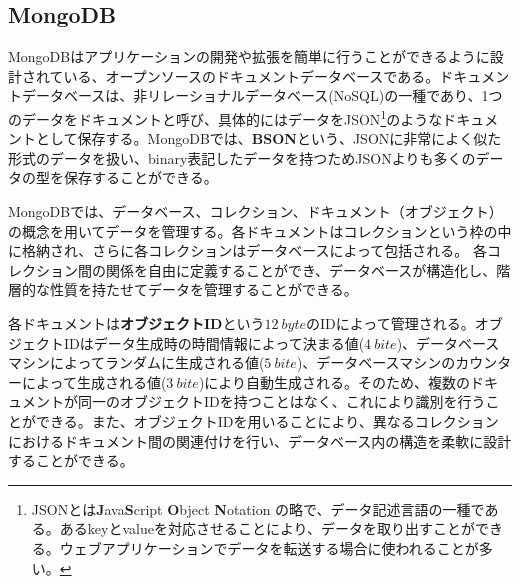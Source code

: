 \subsection{MongoDB\cite{mongo}}
\label{sec:mongo}

MongoDBはアプリケーションの開発や拡張を簡単に行うことができるように設計されている、オープンソースのドキュメントデータベースである。ドキュメントデータベースは、非リレーショナルデータベース(NoSQL)の一種であり、1つのデータをドキュメントと呼び、具体的にはデータをJSON\footnote{JSONとは\textbf{J}ava\textbf{S}cript \textbf{O}bject \textbf{N}otation の略で、データ記述言語の一種である。あるkeyとvalueを対応させることにより、データを取り出すことができる。ウェブアプリケーションでデータを転送する場合に使われることが多い。}のようなドキュメントとして保存する。MongoDBでは、\textbf{BSON}という、JSONに非常によく似た形式のデータを扱い、binary表記したデータを持つためJSONよりも多くのデータの型を保存することができる。

MongoDBでは、データベース、コレクション、ドキュメント（オブジェクト）の概念を用いてデータを管理する。各ドキュメントはコレクションという枠の中に格納され、さらに各コレクションはデータベースによって包括される。
各コレクション間の関係を自由に定義することができ、データベースが構造化し、階層的な性質を持たせてデータを管理することができる。


各ドキュメントは\textbf{オブジェクトID}という$12\ \si{byte}$のIDによって管理される。オブジェクトIDはデータ生成時の時間情報によって決まる値($4\ \si{bite}$)、データベースマシンによってランダムに生成される値($5\ \si{bite}$)、データベースマシンのカウンターによって生成される値($3\ \si{bite}$)により自動生成される。そのため、複数のドキュメントが同一のオブジェクトIDを持つことはなく、これにより識別を行うことができる。また、オブジェクトIDを用いることにより、異なるコレクションにおけるドキュメント間の関連付けを行い、データベース内の構造を柔軟に設計することができる。

